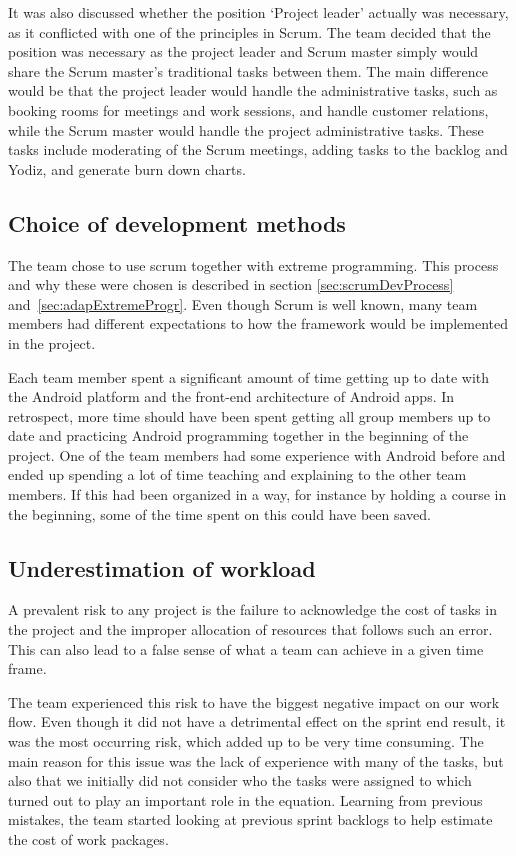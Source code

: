 It was also discussed whether the position `Project leader' actually was necessary, as it conflicted with one of the principles in Scrum. The team decided that the position was necessary as the project leader and Scrum master simply would share the Scrum master's traditional tasks between them. The main difference would be that the project leader would handle the administrative tasks, such as booking rooms for meetings and work sessions, and handle customer relations, while the Scrum master would handle the project administrative tasks. These tasks include moderating of the Scrum meetings, adding tasks to the backlog and Yodiz, and generate burn down charts.

\subsection{Choice of development methods}

The team chose to use scrum together with extreme programming. This process and why these were chosen is described in section \ref{sec:scrumDevProcess} and~\ref{sec:adapExtremeProgr}. Even though Scrum is well known, many team members had different expectations to how the framework would be implemented in the project.

Each team member spent a significant amount of time getting up to date with the Android platform and the front-end architecture of Android apps. In retrospect, more time should have been spent getting all group members up to date and practicing Android programming together in the beginning of the project. One of the team members had some experience with Android before and ended up spending a lot of time teaching and explaining to the other team members. If this had been organized in a way, for instance by holding a course in the beginning, some of the time spent on this could have been saved. 

\subsection{Underestimation of workload}
A prevalent risk to any project is the failure to acknowledge the cost of tasks in the project and the improper allocation of resources that follows such an error. This can also lead to a false sense of what a team can achieve in a given time frame. 

The team experienced this risk to have the biggest negative impact on our work flow. Even though it did not have a detrimental effect on the sprint end result, it was the most occurring risk, which added up to be very time consuming. The main reason for this issue was the lack of experience with many of the tasks, but also that we initially did not consider who the tasks were assigned to which turned out to play an important role in the equation. Learning from previous mistakes, the team started looking at previous sprint backlogs to help estimate the cost of work packages.

